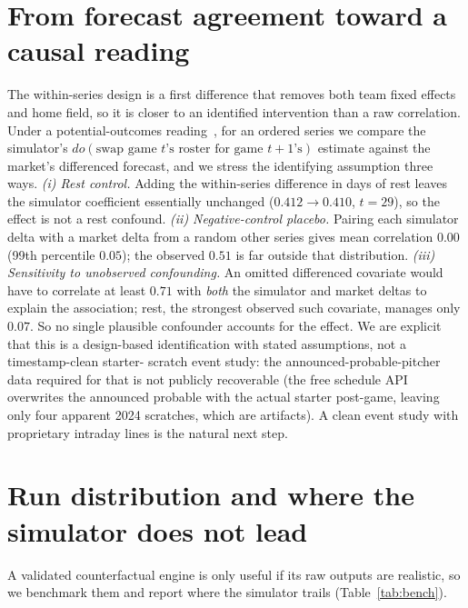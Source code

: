 \documentclass[10pt,twocolumn]{article}
\begin{document}
\section{From forecast agreement toward a causal reading}
\label{sec:causal}
The within-series design is a first difference that removes both team fixed effects and home
field, so it is closer to an identified intervention than a raw correlation. Under a
potential-outcomes reading~\cite{imbens}, for an ordered series we compare the simulator's
$do(\text{swap game }t\text{'s roster for game }t{+}1\text{'s})$ estimate against the market's
differenced forecast, and we stress the identifying assumption three ways. \emph{(i) Rest
control.} Adding the within-series difference in days of rest leaves the simulator coefficient
essentially unchanged ($0.412\!\to\!0.410$, $t{=}29$), so the effect is not a rest confound.
\emph{(ii) Negative-control placebo.} Pairing each simulator delta with a market delta from a
random other series gives mean correlation $0.00$ (99th percentile $0.05$); the observed $0.51$
is far outside that distribution. \emph{(iii) Sensitivity to unobserved confounding.} An omitted
differenced covariate would have to correlate at least $0.71$ with \emph{both} the simulator and
market deltas to explain the association; rest, the strongest observed such covariate, manages
only $0.07$. So no single plausible confounder accounts for the effect. We are explicit that
this is a design-based identification with stated assumptions, not a timestamp-clean starter-
scratch event study: the announced-probable-pitcher data required for that is not publicly
recoverable (the free schedule API overwrites the announced probable with the actual starter
post-game, leaving only four apparent 2024 scratches, which are artifacts). A clean event study
with proprietary intraday lines is the natural next step.

\section{Run distribution and where the simulator does not lead}
\label{sec:bench}
A validated counterfactual engine is only useful if its raw outputs are realistic, so we benchmark them
and report where the simulator trails (Table~\ref{tab:bench}).
\end{document}
